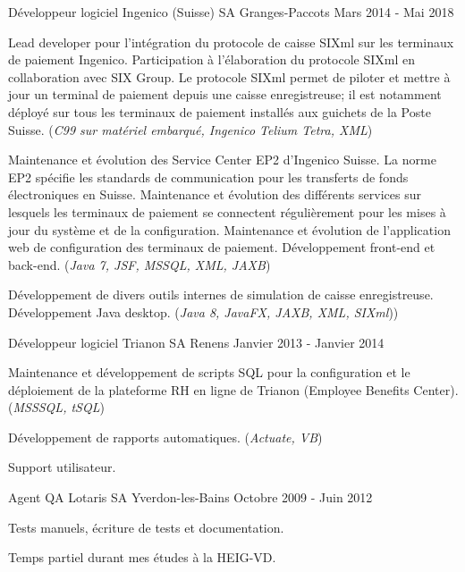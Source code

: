 \begin{cventries}
\cventry
{Développeur logiciel} %
{Ingenico (Suisse) SA} %
{Granges-Paccots} %
{Mars 2014 - Mai 2018} %
{ %
\begin{cvitems}
\item {Lead developer pour l'intégration du protocole de caisse SIXml sur les terminaux de paiement Ingenico. Participation à l'élaboration du protocole SIXml en collaboration avec SIX Group. Le protocole SIXml permet de piloter et mettre à jour un terminal de paiement depuis une caisse enregistreuse; il est notamment déployé sur tous les terminaux de paiement installés aux guichets de la Poste Suisse. (\emph{C99 sur matériel embarqué, Ingenico Telium Tetra, XML})}
\item {Maintenance et évolution des Service Center EP2 d'Ingenico Suisse. La norme EP2 spécifie les standards de communication pour les transferts de fonds électroniques en Suisse. Maintenance et évolution des différents services sur lesquels les terminaux de paiement se connectent régulièrement pour les mises à jour du système et de la configuration. Maintenance et évolution de l'application web de configuration des terminaux de paiement. Développement front-end et back-end. (\emph{Java 7, JSF, MSSQL, XML, JAXB})}
\item {Développement de divers outils internes de simulation de caisse enregistreuse. Développement Java desktop. (\emph{Java 8, JavaFX, JAXB, XML, SIXml}))}
\end{cvitems}
}


\cventry
{Développeur logiciel} %
{Trianon SA} %
{Renens} %
{Janvier 2013 - Janvier 2014} %
{ %
\begin{cvitems}
\item {Maintenance et développement de scripts SQL pour la configuration et le déploiement de la plateforme RH en ligne de Trianon (Employee Benefits Center). (\emph{MSSSQL, tSQL})}
\item {Développement de rapports automatiques. (\emph{Actuate, VB})}
\item {Support utilisateur.}
\end{cvitems} 
}


\cventry
{Agent QA} %
{Lotaris SA} %
{Yverdon-les-Bains} %
{Octobre 2009 - Juin 2012} %
{ %
\begin{cvitems}
\item {Tests manuels, écriture de tests et documentation.}
\item {Temps partiel durant mes études à la HEIG-VD.}
\end{cvitems}
}


\end{cventries}
